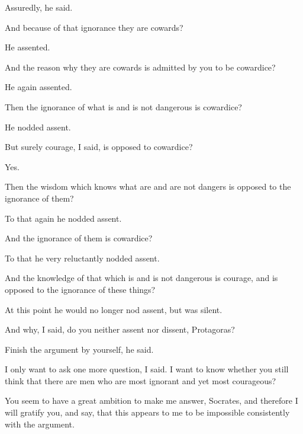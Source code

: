 \documentclass[11pt,letter]{article}
\begin{document}
\par  Assuredly, he said.

\par  And because of that ignorance they are cowards?

\par  He assented.

\par  And the reason why they are cowards is admitted by you to be cowardice?

\par  He again assented.

\par  Then the ignorance of what is and is not dangerous is cowardice?

\par  He nodded assent.

\par  But surely courage, I said, is opposed to cowardice?

\par  Yes.

\par  Then the wisdom which knows what are and are not dangers is opposed to the ignorance of them?

\par  To that again he nodded assent.

\par  And the ignorance of them is cowardice?

\par  To that he very reluctantly nodded assent.

\par  And the knowledge of that which is and is not dangerous is courage, and is opposed to the ignorance of these things?

\par  At this point he would no longer nod assent, but was silent.

\par  And why, I said, do you neither assent nor dissent, Protagoras?

\par  Finish the argument by yourself, he said.

\par  I only want to ask one more question, I said. I want to know whether you still think that there are men who are most ignorant and yet most courageous?

\par  You seem to have a great ambition to make me answer, Socrates, and therefore I will gratify you, and say, that this appears to me to be impossible consistently with the argument.
\end{document}
